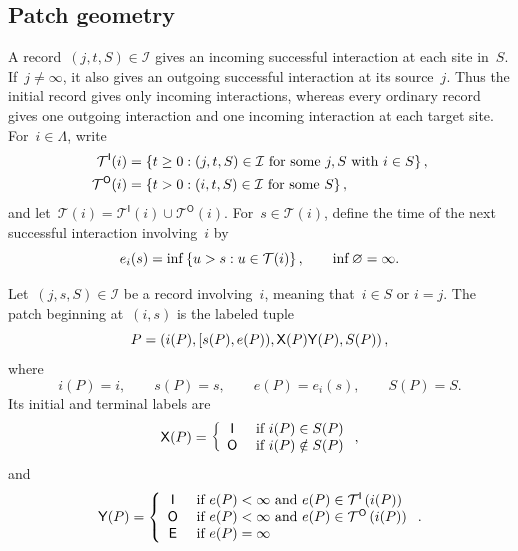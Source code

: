 \subsection{Patch geometry}
\label{subsec:patch-geometry}

A record~$(j,t,S)\in\mathcal I$ gives an incoming successful interaction at
each site in~$S$. If~$j\neq\infty$, it also gives an outgoing successful
interaction at its source~$j$. Thus the initial record gives only incoming
interactions, whereas every ordinary record gives one outgoing interaction and
one incoming interaction at each target site. For~$i\in\Lambda$, write
\begin{align*}
\mathcal T^{\mathsf I}(i)
&=
\left\{t\geq0:(j,t,S)\in\mathcal I
  \text{ for some }j,S\text{ with }i\in S\right\},
\\
\mathcal T^{\mathsf O}(i)
&=
\left\{t>0:(i,t,S)\in\mathcal I\text{ for some }S\right\},
\end{align*}
and let~$\mathcal T(i)=\mathcal T^{\mathsf I}(i)\cup
\mathcal T^{\mathsf O}(i)$. For~$s\in\mathcal T(i)$, define the time of the
next successful interaction involving~$i$ by
\begin{equation*}
e_i(s)=\inf\left\{u>s:u\in\mathcal T(i)\right\},
\qquad
\inf\varnothing=\infty.
\end{equation*}

\begin{definition}[Patch]
\label{def:patch}
Let~$(j,s,S)\in\mathcal I$ be a record involving~$i$, meaning that~$i\in S$ or
$i=j$. The patch beginning at~$(i,s)$ is the labeled tuple
\begin{equation*}
P=
\left(i(P),[s(P),e(P)),\mathsf X(P)\mathsf Y(P),S(P)\right),
\end{equation*}
where
\begin{equation*}
i(P)=i,
\qquad
s(P)=s,
\qquad
e(P)=e_i(s),
\qquad
S(P)=S.
\end{equation*}
Its initial and terminal labels are
\begin{equation*}
\mathsf X(P)=
\left\{\begin{array}{cl} \mathsf I &\text{ if } i(P)\in S(P) \\ \mathsf O &\text{ if } i(P)\notin S(P) \end{array}\right.,
\end{equation*}
and
\begin{equation*}
\mathsf Y(P)=
\left\{\begin{array}{cl} \mathsf I &\text{ if } e(P)<\infty\text{ and }e(P)\in\mathcal T^{\mathsf I}\left(i(P)\right) \\ \mathsf O &\text{ if } e(P)<\infty\text{ and }e(P)\in\mathcal T^{\mathsf O}\left(i(P)\right) \\ \mathsf E &\text{ if } e(P)=\infty \end{array}\right..
\end{equation*}
\end{definition}

